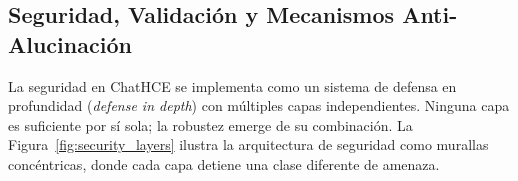 \subsection{Seguridad, Validación y Mecanismos Anti-Alucinación}
\label{sec:seguridad}

La seguridad en ChatHCE se implementa como un sistema de defensa en profundidad (\textit{defense in depth}) con múltiples capas independientes. Ninguna capa es suficiente por sí sola; la robustez emerge de su combinación. La Figura~\ref{fig:security_layers} ilustra la arquitectura de seguridad como murallas concéntricas, donde cada capa detiene una clase diferente de amenaza.


